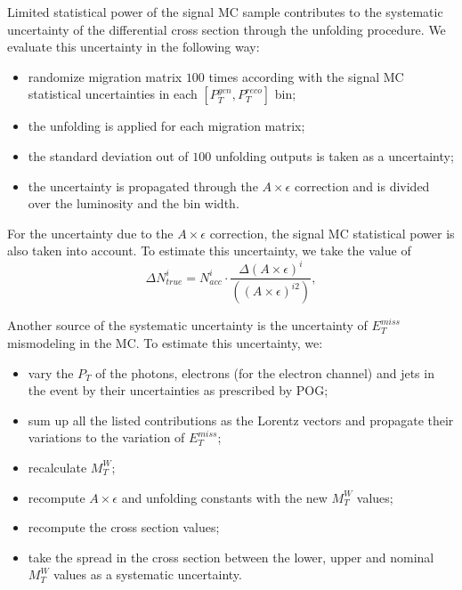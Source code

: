
Limited statistical power of the signal MC sample contributes to the systematic uncertainty of the differential cross section through the unfolding procedure. We evaluate this uncertainty in the following way:
\begin{itemize}
  \item randomize migration matrix $100$ times according with the signal MC statistical uncertainties in each $[P_T^{gen},P_T^{reco}]$ bin;
  \item the unfolding is applied for each migration matrix;
  \item the standard deviation out of $100$ unfolding outputs is taken as a uncertainty;
  \item the uncertainty is propagated through the $A\times\epsilon$ correction and is divided over the luminosity and the bin width.
\end{itemize}


For the uncertainty due to the $A \times \epsilon$ correction, the signal MC statistical power is also taken into account. To estimate this uncertainty, we take the value of 
\begin{equation}
\Delta N_{true}^i= N_{acc}^i \cdot \frac{\Delta{(A\times \epsilon)^i}} { ((A\times \epsilon)^{i2})}, 
\end{equation}


Another source of the systematic uncertainty is the uncertainty of $E_T^{miss}$ mismodeling in the MC. To estimate this uncertainty, we:
\begin{itemize}
  \item vary the $P_T$ of the photons, electrons (for the electron channel) and jets in the event by their uncertainties as prescribed by POG;
  \item sum up all the listed contributions as the Lorentz vectors and propagate their variations to the variation of $E_T^{miss}$;
  \item recalculate $M_T^{W}$;
  \item recompute $A \times \epsilon$ and unfolding constants with the new $M_T^{W}$ values;
  \item recompute the cross section values;
  \item take the spread in the cross section between the lower, upper and nominal $M_T^{W}$ values as a systematic uncertainty.
\end{itemize}

